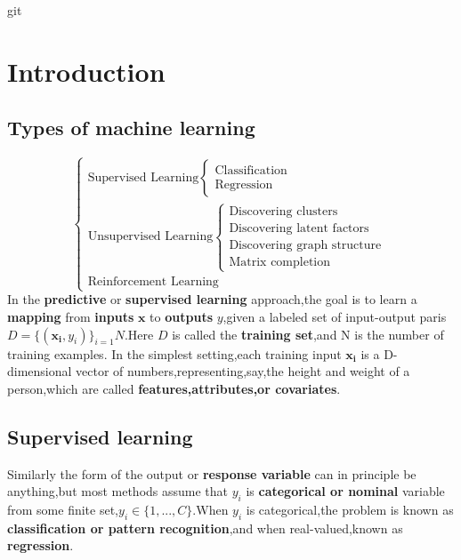 git\chapter{Introduction}
\label{chapter:Introduction}

\section{Types of machine learning}
\begin{equation}\nonumber
\begin{cases}
\text{Supervised Learning} \begin{cases} \text{Classification} \\ \text{Regression} \end{cases}\\
\text{Unsupervised Learning} \begin{cases} \text{Discovering clusters} \\ \text{Discovering latent factors} \\ \text{Discovering graph structure} \\ \text{Matrix completion} \end{cases}\\
\text{Reinforcement Learning}
\end{cases}
\end{equation}
In the \textbf{predictive} or \textbf{supervised learning} approach,the goal is to learn a \textbf{mapping} from \textbf{inputs} $\mathbf{x}$ to \textbf{outputs} $y$,given a labeled set of input-output paris $D=\{(\mathbf{x_i},y_i)\}_{i=1}{N}$.Here $D$ is called the \textbf{training set},and N is the number of training examples.
In the simplest setting,each training input $\mathbf{x_i}$ is a D-dimensional vector of numbers,representing,say,the height and weight of a person,which are called \textbf{features,attributes,or covariates}.

\section{Supervised learning}
  Similarly the form of the output or \textbf{response variable} can in principle be anything,but most methods assume that $y_i$ is \textbf{categorical or nominal} variable from some finite set,$y_i \in \{1,...,C\}$.When $y_i$ is categorical,the problem is known as \textbf{classification or pattern recognition},and when real-valued,known as \textbf{regression}.
